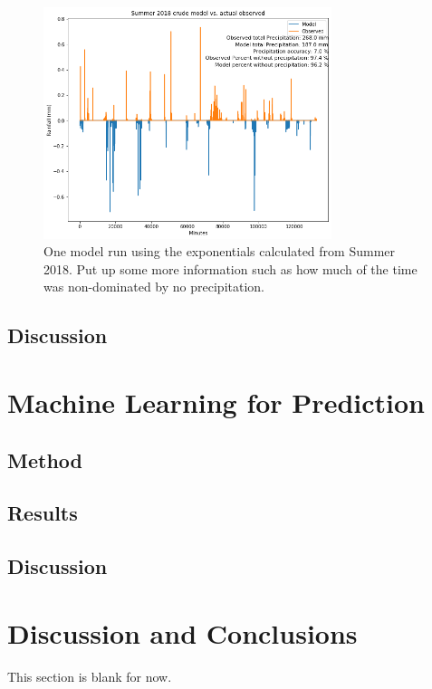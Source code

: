 \documentclass[11pt]{report}
\begin{document}
\clearpage
\begin{figure}[t]
  \centering
  \includegraphics[width=0.75\textwidth]{Figures/run_with_more_info.png}
  \caption[More  run using Summer 2018 climatology]
  {\label{crudesmodel} One model run using the exponentials calculated from
    Summer 2018. Put up some more information such as how much of the time
    was non-dominated by no precipitation.}
\end{figure}

\subsection{Discussion}\label{sec:spcd}

\clearpage

\section{Machine Learning for Prediction}\label{sec:sfp}






\subsection{Method}

\subsection{Results}

\subsection{Discussion}


\clearpage

\section{Discussion and Conclusions}\label{sec:conclusions}

This section is blank for now. 

\small
\renewcommand{\bibsep}{0em}

\renewcommand{\bibname}{References}


\end{document}
